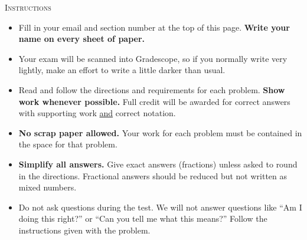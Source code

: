\thispagestyle{cover-page-style}


\noindent \textsc{Instructions}
\begin{small}
\begin{itemize}
\item Fill in your email and section number at the top of this page. \textbf{Write your name on every sheet of paper.}
\item Your exam will be scanned into Gradescope, so if you normally write very lightly, make an effort to write a little darker than usual.
\item Read and follow the directions and requirements for each problem. \textbf{Show work whenever possible.} Full credit will be awarded for correct answers with supporting work \underline{and} correct notation.
\item \textbf{No scrap paper allowed.} Your work for each problem must be contained in the space for that problem.
\item \textbf{Simplify all answers.} Give exact answers (fractions) unless asked to round in the directions. Fractional answers should be reduced but not written as mixed numbers.
\item Do not ask questions during the test. We will not answer questions like ``Am I doing this right?'' or ``Can you tell me what this means?'' Follow the instructions given with the problem.\\
\end{itemize}
\end{small}

